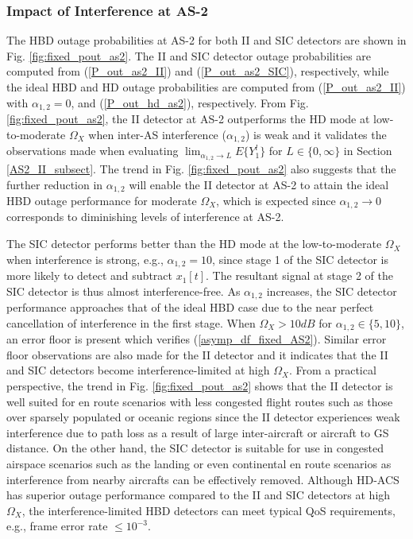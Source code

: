 \subsubsection{Impact of Interference at AS-2}
The HBD outage probabilities at AS-2 for both II and SIC detectors are shown in Fig. \ref{fig:fixed_pout_as2}. The II and SIC detector outage probabilities are computed from (\ref{P_out_as2_II}) and (\ref{P_out_as2_SIC}), respectively, while the ideal HBD and HD outage probabilities are computed from (\ref{P_out_as2_II}) with $\alpha_{1,2}=0$, and (\ref{P_out_hd_as2}), respectively. From Fig. \ref{fig:fixed_pout_as2}, the II detector at AS-2 outperforms the HD mode at low-to-moderate $\Omega_X$ when inter-AS interference ($\alpha_{1,2}$) is weak and it validates the observations made when evaluating $\lim_{\alpha_{1,2} \to L} E\{Y_1^l\}$ for $L \in \{0,\infty\}$ in Section \ref{AS2_II_subsect}. The trend in Fig. \ref{fig:fixed_pout_as2} also suggests that the further reduction in $\alpha_{1,2}$ will enable the II detector at AS-2 to attain the ideal HBD outage performance for moderate $\Omega_X$, which is expected since $\alpha_{1,2}\to 0$ corresponds to diminishing levels of interference at AS-2. 

The SIC detector performs better than the HD mode at the low-to-moderate $\Omega_X$ when interference is strong, e.g., $\alpha_{1,2}=10$, since stage 1 of the SIC detector is more likely to detect and subtract $x_1[t]$. The resultant signal at stage 2 of the SIC detector is thus almost interference-free. As $\alpha_{1,2}$ increases, the SIC detector performance approaches that of the ideal HBD case due to the near perfect cancellation of interference in the first stage. When $\Omega_X>10dB$ for $\alpha_{1,2}\in\{5,10\}$, an error floor is present which verifies (\ref{asymp_df_fixed_AS2}). Similar error floor observations are also made for the II detector and it indicates that the II and SIC detectors become interference-limited at high $\Omega_X$. From a practical perspective, the trend in Fig. \ref{fig:fixed_pout_as2} shows that the II detector is well suited for en route scenarios with less congested flight routes such as those over sparsely populated or oceanic regions since the II detector experiences weak interference due to path loss as a result of large inter-aircraft or aircraft to GS distance. On the other hand, the SIC detector is suitable for use in congested airspace scenarios such as the landing or even continental en route scenarios as interference from nearby aircrafts can be effectively removed. Although HD-ACS has superior outage performance compared to the II and SIC detectors at high $\Omega_X$, the interference-limited HBD detectors can meet typical QoS requirements, e.g., frame error rate $\leq 10^{-3}$.

